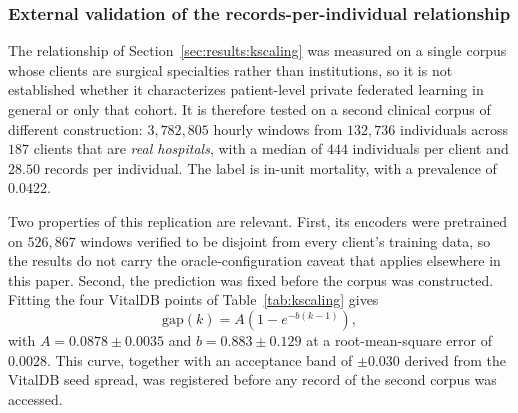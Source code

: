 %
%

\subsubsection{External validation of the records-per-individual relationship}
\label{sec:results:kscaling:eicu}

The relationship of Section~\ref{sec:results:kscaling} was measured on a single corpus
whose clients are surgical specialties rather than institutions, so it is not
established whether it characterizes patient-level private federated learning
in general or only that cohort. It is therefore tested on a second clinical
corpus of different construction: $3{,}782{,}805$ hourly windows from
$132{,}736$ individuals across $187$ clients that are \emph{real hospitals},
with a median of $444$ individuals per client and $28.50$ records per
individual. The label is in-unit mortality, with a prevalence of $0.0422$.

Two properties of this replication are relevant. First, its encoders were
pretrained on $526{,}867$ windows verified to be disjoint from every client's
training data, so the results do not carry the oracle-configuration caveat that
applies elsewhere in this paper. Second, the prediction was fixed before the
corpus was constructed. Fitting the four VitalDB points of
Table~\ref{tab:kscaling} gives
\begin{equation}
\mathrm{gap}(k) = A\left(1 - e^{-b(k-1)}\right),
\label{eq:kcurve}
\end{equation}
with $A = 0.0878 \pm 0.0035$ and $b = 0.883 \pm 0.129$ at a root-mean-square
error of $0.0028$. This curve, together with an acceptance band of $\pm 0.030$
derived from the VitalDB seed spread, was registered before any record of the
second corpus was accessed.

